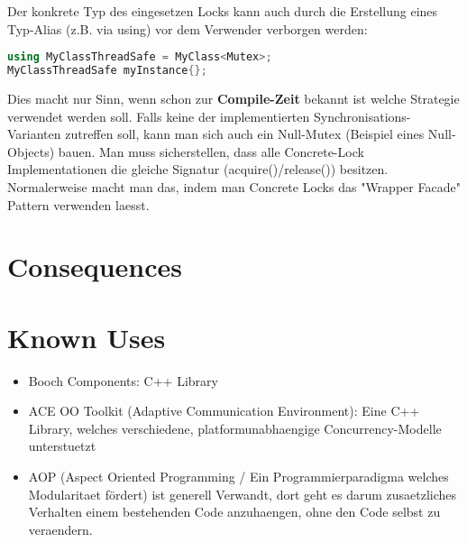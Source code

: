 Der konkrete Typ des eingesetzen Locks kann auch durch die Erstellung eines Typ-Alias (z.B. via using) vor dem Verwender verborgen werden:
\begin{lstlisting}[language=C++]
using MyClassThreadSafe = MyClass<Mutex>;
MyClassThreadSafe myInstance{};
\end{lstlisting}

Dies macht nur Sinn, wenn schon zur \textbf{Compile-Zeit} bekannt ist welche Strategie verwendet werden soll. Falls keine der implementierten Synchronisations-Varianten zutreffen soll, kann man sich auch ein Null-Mutex (Beispiel eines Null-Objects) bauen.  Man muss sicherstellen, dass alle Concrete-Lock Implementationen die gleiche Signatur (acquire()/release()) besitzen.  Normalerweise macht man das, indem man Concrete Locks das "Wrapper Facade" Pattern verwenden laesst.

\section{Consequences}
\begin{itemize}
\end{itemize}

\section{Known Uses}
\begin{itemize}
  \item Booch Components: C++ Library
  \item ACE OO Toolkit (Adaptive Communication Environment): Eine C++ Library, welches verschiedene, platformunabhaengige Concurrency-Modelle unterstuetzt
  \item AOP (Aspect Oriented Programming / Ein Programmierparadigma welches Modularitaet fördert) ist generell Verwandt, dort geht es darum zusaetzliches Verhalten einem bestehenden Code anzuhaengen, ohne den Code selbst zu veraendern.
\end{itemize}


